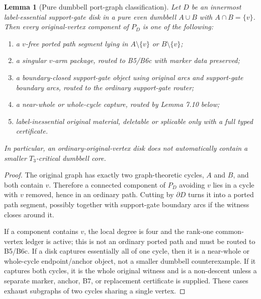 \documentclass[11pt]{amsart}
\newtheorem{lemma}[theorem]{Lemma}
\theoremstyle{definition}
\begin{document}
\begin{lemma}[Pure dumbbell port-graph classification]
Let \(D\) be an innermost label-essential support-gate disk in a pure even dumbbell \(A\cup B\) with \(A\cap B=\{v\}\). Then every original-vertex component of \(P_D\) is one of the following:

\begin{enumerate}
\item a \(v\)-free ported path segment lying in \(A\setminus\{v\}\) or \(B\setminus\{v\}\);
\item a singular \(v\)-arm package, routed to B5/B6c with marker data preserved;
\item a boundary-closed support-gate object using original arcs and support-gate boundary arcs, routed to the ordinary support-gate router;
\item a near-whole or whole-cycle capture, routed by Lemma 7.10 below;
\item label-inessential original material, deletable or splicable only with a full typed certificate.
\end{enumerate}

In particular, an ordinary-original-vertex disk does not automatically contain a smaller \(T_3\)-critical dumbbell core.

\end{lemma}
\begin{proof}
The original graph has exactly two graph-theoretic cycles, \(A\) and \(B\), and both contain \(v\). Therefore a connected component of \(P_D\) avoiding \(v\) lies in a cycle with \(v\) removed, hence in an ordinary path. Cutting by \(\partial D\) turns it into a ported path segment, possibly together with support-gate boundary arcs if the witness closes around it.

If a component contains \(v\), the local degree is four and the rank-one common-vertex ledger is active; this is not an ordinary ported path and must be routed to B5/B6c. If a disk captures essentially all of one cycle, then it is a near-whole or whole-cycle endpoint/anchor object, not a smaller dumbbell counterexample. If it captures both cycles, it is the whole original witness and is a non-descent unless a separate marker, anchor, B7, or replacement certificate is supplied. These cases exhaust subgraphs of two cycles sharing a single vertex.

\end{proof}
\end{document}
